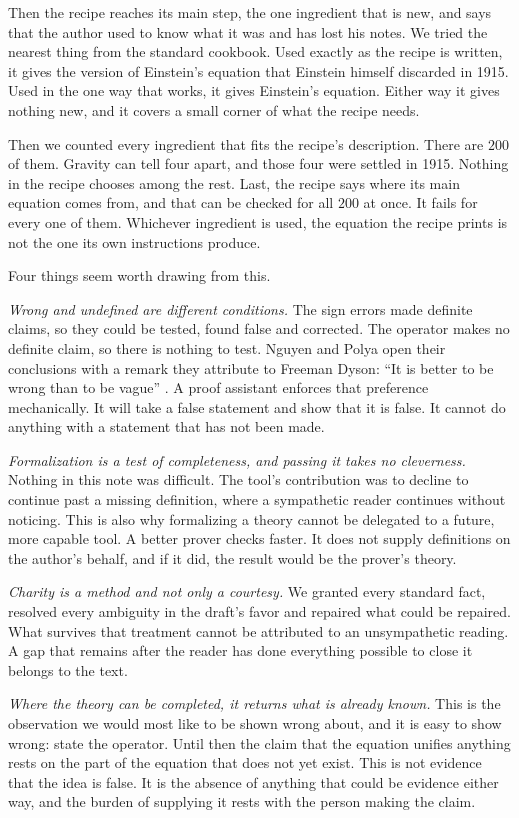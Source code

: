 \documentclass[11pt]{article}
\theoremstyle{remark}
\begin{document}
Then the recipe reaches its main step, the one ingredient that is new, and says that the
author used to know what it was and has lost his notes. We tried the nearest thing from the
standard cookbook. Used exactly as the recipe is written, it gives the version of Einstein's
equation that Einstein himself discarded in 1915. Used in the one way that works, it gives
Einstein's equation. Either way it gives nothing new, and it covers a small corner of what
the recipe needs.

Then we counted every ingredient that fits the recipe's description. There are $200$ of them.
Gravity can tell four apart, and those four were settled in 1915. Nothing in the recipe chooses
among the rest. Last, the recipe says where its main equation comes from, and that can be
checked for all $200$ at once. It fails for every one of them. Whichever ingredient is used,
the equation the recipe prints is not the one its own instructions produce.

Four things seem worth drawing from this.

\emph{Wrong and undefined are different conditions.} The sign errors made definite claims, so
they could be tested, found false and corrected. The operator makes no definite
claim, so there is nothing to test. Nguyen and Polya open their conclusions with a remark they attribute to Freeman Dyson: ``It is
better to be wrong than to be vague'' \cite[Section~4]{NP}. A proof assistant enforces that preference mechanically.
It will take a false statement and show that it is false. It cannot do anything with a
statement that has not been made.

\emph{Formalization is a test of completeness, and passing it takes no cleverness.} Nothing in
this note was difficult. The tool's contribution was to decline to continue past a missing
definition, where a sympathetic reader continues without noticing. This is also why
formalizing a theory cannot be delegated to a future, more capable tool. A better prover
checks faster. It does not supply definitions on the author's behalf, and if it did, the
result would be the prover's theory.

\emph{Charity is a method and not only a courtesy.} We granted every standard fact, resolved
every ambiguity in the draft's favor and repaired what could be repaired. What survives that
treatment cannot be attributed to an unsympathetic reading. A gap that remains after the
reader has done everything possible to close it belongs to the text.

\emph{Where the theory can be completed, it returns what is already known.} This is the
observation we would most like to be shown wrong about, and it is easy to show wrong: state
the operator. Until then the claim that the equation unifies anything rests on the part of the
equation that does not yet exist. This is not evidence that the idea is false. It is the
absence of anything that could be evidence either way, and the burden of supplying it rests
with the person making the claim.
\end{document}

